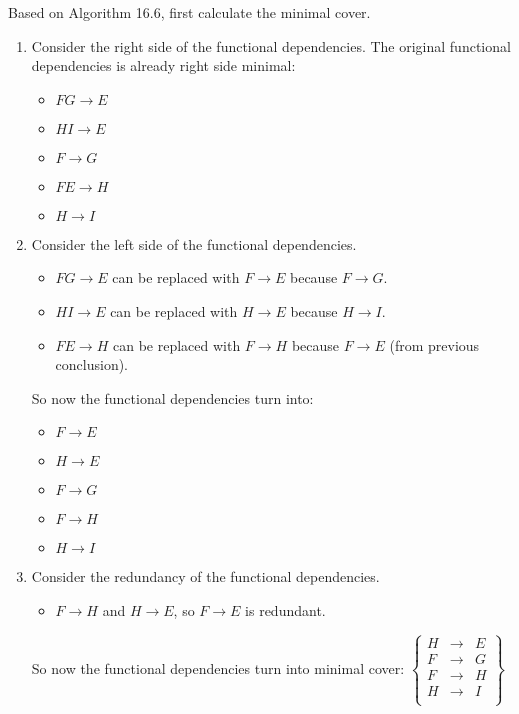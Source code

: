 \documentclass[12pt,letterpaper,titlepage,en-US]{article}
\begin{document}
\begin{homeworkProblem}
Based on Algorithm 16.6, first calculate the minimal cover.
    \begin{enumerate}[label=\textbf{Step {\arabic*}}, leftmargin=2cm]
        \item Consider the right side of the functional dependencies.
            The original functional dependencies is already right side minimal:
            \begin{itemize}
                \item $FG \rightarrow E$
                \item $HI \rightarrow E$
                \item $F \rightarrow G$
                \item $FE \rightarrow H$
                \item $H \rightarrow I$
            \end{itemize}
        \item Consider the left side of the functional dependencies.
            \begin{itemize}
                \item $FG \rightarrow E$ can be replaced with $F \rightarrow E$ because $F \rightarrow G$.
                \item $HI \rightarrow E$ can be replaced with $H \rightarrow E$ because $H \rightarrow I$.
                \item $FE \rightarrow H$ can be replaced with $F \rightarrow H$ because $F \rightarrow E$ (from previous conclusion).
            \end{itemize}
            So now the functional dependencies turn into:
            \begin{itemize}
                \item $F \rightarrow E$
                \item $H \rightarrow E$
                \item $F \rightarrow G$
                \item $F \rightarrow H$
                \item $H \rightarrow I$
            \end{itemize}
        \item Consider the redundancy of the functional dependencies.
            \begin{itemize}
                \item $F \rightarrow H$ and $H \rightarrow E$, so $F \rightarrow E$ is redundant.
            \end{itemize}
            So now the functional dependencies turn into minimal cover:
            $\displaystyle\left\{
                    \begin{array}{rcl}
                        H &\rightarrow& E \\
                        F &\rightarrow& G \\
                        F &\rightarrow& H \\
                        H &\rightarrow& I \\
                    \end{array}
            \right\}$


\end{enumerate}
\end{homeworkProblem}
\end{document}

